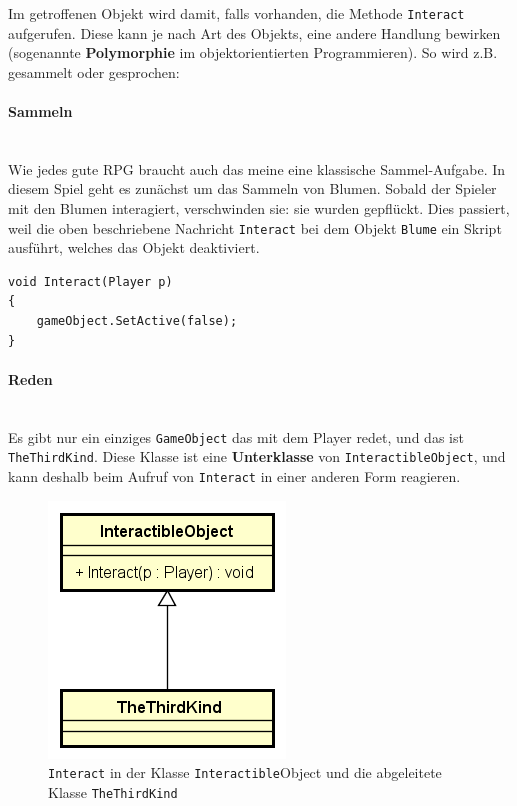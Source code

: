 Im getroffenen Objekt wird damit, falls vorhanden, die Methode \lstinline{Interact} aufgerufen. Diese kann je nach Art des Objekts, eine andere Handlung bewirken (sogenannte \textbf{Polymorphie} im objektorientierten Programmieren). So wird z.B. gesammelt oder gesprochen:

\paragraph{Sammeln}\mbox{} \\
Wie jedes gute RPG braucht auch das meine eine klassische Sammel-Aufgabe.
In diesem Spiel geht es zunächst um das Sammeln von Blumen. Sobald der Spieler mit den Blumen interagiert, verschwinden sie: sie wurden gepflückt.
Dies passiert, weil die oben beschriebene Nachricht \lstinline{Interact} bei dem Objekt \lstinline{Blume} ein Skript ausführt, welches das Objekt deaktiviert.
\begin{lstlisting}[caption={Standardimplementation von Interact}]
void Interact(Player p)
{
	gameObject.SetActive(false);
}
\end{lstlisting}
 
\paragraph{Reden}\mbox{} \\
Es gibt nur ein einziges \lstinline{GameObject} das mit dem Player redet, und das ist \lstinline{TheThirdKind}. Diese Klasse ist eine \textbf{Unterklasse} von \lstinline{InteractibleObject}, und kann deshalb beim Aufruf von \lstinline{Interact} in einer anderen Form reagieren.

\begin{figure}[H]
\includegraphics[scale=0.75]{diagramme/interactibleobject.png}
\caption{\lstinline{Interact} in der Klasse \lstinline{Interactible}Object und die abgeleitete Klasse \lstinline{TheThirdKind}}
\end{figure}

